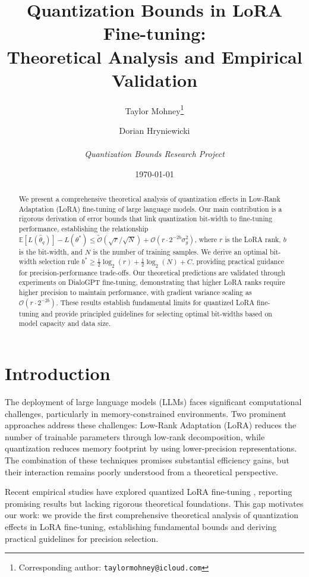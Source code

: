 \documentclass[10pt,twocolumn]{article}
\title{Quantization Bounds in LoRA Fine-tuning: \\
Theoretical Analysis and Empirical Validation}
\author{
Taylor Mohney\thanks{Corresponding author: \texttt{taylormohney@icloud.com}} \and Dorian Hryniewicki\\
\\
\textit{Quantization Bounds Research Project}
}
\date{\today}
\begin{document}
\maketitle

\begin{abstract}
We present a comprehensive theoretical analysis of quantization effects in Low-Rank Adaptation (LoRA) fine-tuning of large language models. Our main contribution is a rigorous derivation of error bounds that link quantization bit-width to fine-tuning performance, establishing the relationship $\mathbb{E}[L(\hat{\theta}_q)] - L(\theta^*) \leq \tilde{\mathcal{O}}(\sqrt{r}/\sqrt{N}) + \mathcal{O}(r \cdot 2^{-2b}\sigma_g^2)$, where $r$ is the LoRA rank, $b$ is the bit-width, and $N$ is the number of training samples. We derive an optimal bit-width selection rule $b^* \geq \frac{1}{2}\log_2(r) + \frac{1}{2}\log_2(N) + C$, providing practical guidance for precision-performance trade-offs. Our theoretical predictions are validated through experiments on DialoGPT fine-tuning, demonstrating that higher LoRA ranks require higher precision to maintain performance, with gradient variance scaling as $\mathcal{O}(r \cdot 2^{-2b})$. These results establish fundamental limits for quantized LoRA fine-tuning and provide principled guidelines for selecting optimal bit-widths based on model capacity and data size.
\end{abstract}

\section{Introduction}

The deployment of large language models (LLMs) faces significant computational challenges, particularly in memory-constrained environments. Two prominent approaches address these challenges: Low-Rank Adaptation (LoRA) \citep{hu2021lora} reduces the number of trainable parameters through low-rank decomposition, while quantization \citep{jacob2018quantization} reduces memory footprint by using lower-precision representations. The combination of these techniques promises substantial efficiency gains, but their interaction remains poorly understood from a theoretical perspective.

Recent empirical studies have explored quantized LoRA fine-tuning \citep{dettmers2023qlora, xu2023qr-adaptor}, reporting promising results but lacking rigorous theoretical foundations. This gap motivates our work: we provide the first comprehensive theoretical analysis of quantization effects in LoRA fine-tuning, establishing fundamental bounds and deriving practical guidelines for precision selection.
\end{document}
